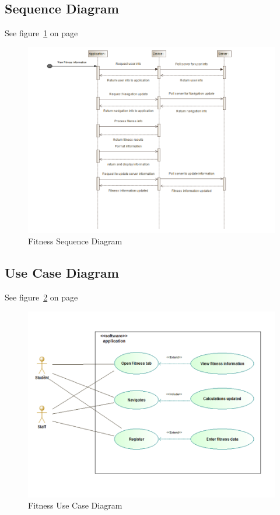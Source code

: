 \subsection{Sequence Diagram}
See figure~\ref{fig:Fitness_Sequence_Diagram} on page~\pageref{fig:Fitness_Sequence_Diagram}
\begin{figure}
	\centering
	\includegraphics[scale=0.54]{Fitness/Fitness_Sequence_Diagram.png}
	\caption{Fitness Sequence Diagram}
	\label{fig:Fitness_Sequence_Diagram}
\end{figure}

\subsection{Use Case Diagram}
See figure~\ref{fig:Fitness_Use_Case_Diagram} on page~\pageref{fig:Fitness_Use_Case_Diagram}
\begin{figure}
	\centering
	\includegraphics[scale=0.54]{Fitness/Fitness_Use_Case_Diagram.png}
	\caption{Fitness Use Case Diagram}
	\label{fig:Fitness_Use_Case_Diagram}
\end{figure}

